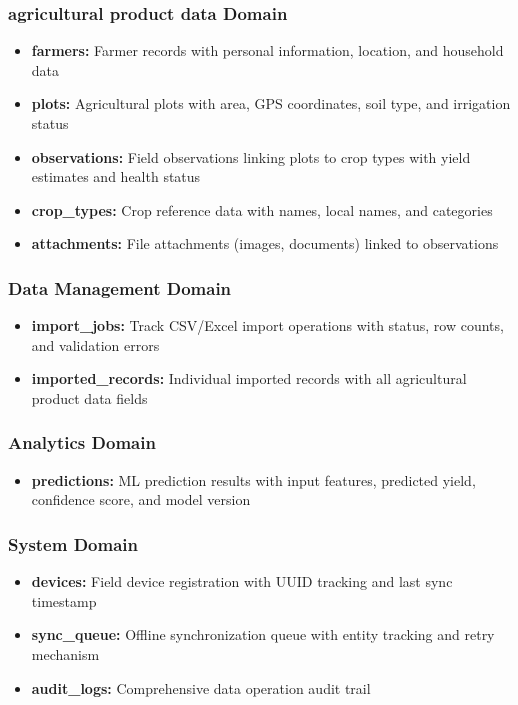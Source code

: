 \subsubsection{agricultural product data Domain}
\begin{itemize}
  \item \textbf{farmers:} Farmer records with personal information, location, and household data
  \item \textbf{plots:} Agricultural plots with area, GPS coordinates, soil type, and irrigation status
  \item \textbf{observations:} Field observations linking plots to crop types with yield estimates and health status
  \item \textbf{crop\_types:} Crop reference data with names, local names, and categories
  \item \textbf{attachments:} File attachments (images, documents) linked to observations
\end{itemize}

\subsubsection{Data Management Domain}
\begin{itemize}
  \item \textbf{import\_jobs:} Track CSV/Excel import operations with status, row counts, and validation errors
  \item \textbf{imported\_records:} Individual imported records with all agricultural product data fields
\end{itemize}

\subsubsection{Analytics Domain}
\begin{itemize}
  \item \textbf{predictions:} ML prediction results with input features, predicted yield, confidence score, and model version
\end{itemize}

\subsubsection{System Domain}
\begin{itemize}
  \item \textbf{devices:} Field device registration with UUID tracking and last sync timestamp
  \item \textbf{sync\_queue:} Offline synchronization queue with entity tracking and retry mechanism
  \item \textbf{audit\_logs:} Comprehensive data operation audit trail
\end{itemize}

